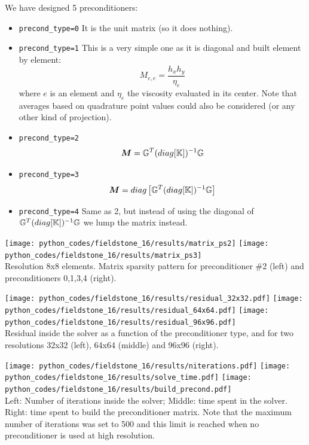 We have designed 5 preconditioners:
\begin{itemize}
\item {\tt precond\_type=0} It is the unit matrix (so it does nothing). 
\item {\tt precond\_type=1} This is a very simple one as it is
diagonal and built element by element:
\[
M_{e,e} = \frac{h_x h_y}{\eta_e} 
\]
where $e$ is an element and $\eta_e$ the viscosity evaluated in its center. Note that 
averages based on quadrature point values could also be considered (or any other kind of projection).
\item {\tt precond\_type=2}
\[
{\bm M} = {\mathbb{G}}^T (diag [{\mathbb{K}}]  )^{-1} {\mathbb{G}} 
\]
\item {\tt precond\_type=3} 
\[
{\bm M} = diag \left[ {\mathbb{G}}^T (diag [{\mathbb{K}}]  )^{-1} {\mathbb{G}} \right]
\]
\item {\tt precond\_type=4} Same as 2, but instead of using the 
diagonal of $ {\mathbb{G}}^T (diag [{\mathbb{K}}]  )^{-1} {\mathbb{G}}$ we lump the matrix instead.

\end{itemize}


\begin{center} 
\texttt{[image: python\_codes/fieldstone\_16/results/matrix\_ps2]}
\texttt{[image: python\_codes/fieldstone\_16/results/matrix\_ps3]}\\
{\captionfont Resolution 8x8 elements. Matrix sparsity pattern 
for preconditioner \#2 (left) and preconditioners 0,1,3,4 (right).}
\end{center}


\begin{center} 
\texttt{[image: python\_codes/fieldstone\_16/results/residual\_32x32.pdf]}
\texttt{[image: python\_codes/fieldstone\_16/results/residual\_64x64.pdf]}
\texttt{[image: python\_codes/fieldstone\_16/results/residual\_96x96.pdf]}\\
{\captionfont Residual inside the solver as a function of the preconditioner type, 
and for two resolutions 32x32 (left), 64x64 (middle) and 96x96 (right).}
\end{center}


\begin{center} 
\texttt{[image: python\_codes/fieldstone\_16/results/niterations.pdf]}
\texttt{[image: python\_codes/fieldstone\_16/results/solve\_time.pdf]}
\texttt{[image: python\_codes/fieldstone\_16/results/build\_precond.pdf]}\\
{\captionfont Left: Number of iterations inside the solver; 
Middle: time spent in the solver.
Right: time spent to build the preconditioner matrix.
Note that the maximum number of iterations was set to 500 and this 
limit is reached when no preconditioner is used at high resolution.}
\end{center} 

